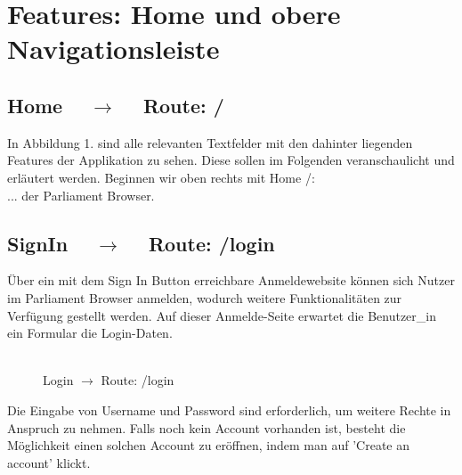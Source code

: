 \documentclass[10pt]{report}
\begin{document}
\chapter{Features: Home und obere Navigationsleiste }
\section{Home $\quad\rightarrow\quad$  Route:  /}
In Abbildung 1. sind alle relevanten Textfelder mit den dahinter liegenden Features der Applikation zu sehen. Diese sollen im Folgenden veranschaulicht und erläutert werden. 
Beginnen wir oben rechts mit Home /:  \\...  der Parliament Browser. \\
\section{SignIn $\quad\rightarrow\quad$  Route:  /login}
Über ein mit dem Sign In Button erreichbare Anmeldewebsite können sich Nutzer im Parliament Browser anmelden, wodurch weitere Funktionalitäten zur Verfügung gestellt werden. Auf dieser Anmelde-Seite erwartet die Benutzer\_in ein Formular die Login-Daten.   \\\\

    
\begin{figure}[H]
	\begin{center}		
  	 \end{center}
	\caption{Login $\rightarrow$  Route:  /login }
\end{figure}


\noindent Die Eingabe von Username und Password sind erforderlich, um weitere Rechte in Anspruch zu nehmen. Falls noch kein Account vorhanden ist, besteht die Möglichkeit einen solchen Account zu eröffnen, indem man auf 'Create an account' klickt.
	
\end{document}
